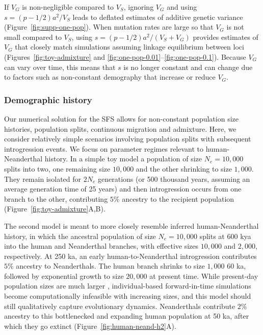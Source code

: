 \documentclass[10pt,letterpaper]{article}
\begin{document}
If $V_G$ is non-negligible compared to $V_S$, ignoring $V_G$ and using
$s=(p-1/2)a^2/V_S$ leads to deflated estimates of additive genetic variance
(Figure~\ref{fig:supp-one-pop}). When mutation rates are large so that $V_G$ is
not small compared to $V_S$, using $s=(p-1/2)a^2/(V_S+V_G)$ provides estimates
of $V_G$ that closely match simulations assuming linkage equilibrium between
loci (Figures~\ref{fig:toy-admixture} and
\ref{fig:one-pop-0.01}--\ref{fig:one-pop-0.1}). Because $V_G$ can vary over
time, this means that $s$ is no longer constant and can change due to factors
such as non-constant demography that increase or reduce $V_G$.

\subsubsection*{Demographic history}

Our numerical solution for the SFS allows for non-constant population size
histories, population splits, continuous migration and admixture. Here, we
consider relatively simple scenarios involving population splits with
subsequent introgression events. We focus on parameter regimes relevant to
human-Neanderthal history. In a simple toy model a population of size
$N_e=10{,}000$ splits into two, one remaining size $10{,}000$ and the other
shrinking to size $1{,}000$. They remain isolated for $2N_e$ generations (or
500 thousand years, assuming an average generation time of 25 years) and then
introgression occurs from one branch to the other, contributing $5\%$ ancestry
to the recipient population (Figure~\ref{fig:toy-admixture}A,B).

The second model is meant to more closely resemble inferred human-Neanderthal
history, in which the ancestral population of size $N_e=10{,}000$ splits at 600
kya into the human and Neanderthal branches, with effective sizes $10{,}000$
and $2{,}000$, respectively. At 250 ka, an early human-to-Neanderthal
introgression contributes $5\%$ ancestry to Neanderthals. The human branch
shrinks to size $1{,}000$ 60 ka, followed by exponential growth to size
$20,000$ at present time. While present-day population sizes are much larger
\cite{tennessen2012evolution}, individual-based forward-in-time simulations
become computationally infeasible with increasing sizes, and this model should
still qualitatively capture evolutionary dynamics. Neanderthals contribute
$2\%$ ancestry to this bottlenecked and expanding human population at 50 ka,
after which they go extinct (Figure~\ref{fig:human-neand-h2}A).
\end{document}

